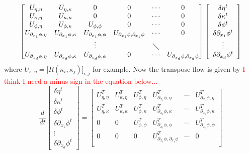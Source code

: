 \documentclass[noinfoline]{imsart}
\begin{document}
{\begin{equation}
\begin{bmatrix}
U_{\eta,\eta} & U_{\eta,\kappa} & 0 &  0 & \cdots  &  0\\
U_{\kappa,\eta} & U_{\kappa,\kappa} & 0 &  0 & \cdots  &  0\\
U_{\phi,\eta} & U_{\phi,\kappa} & U_{\phi,\phi} & 0 & \cdots  &  0\\
U_{\partial_{x_1} \phi,\eta} & U_{\partial_{x_1} \phi,\kappa} & U_{\partial_{x_1} \phi,\phi} & U_{\partial_{x_1} \phi,\partial_{x_1} \phi} & \cdots  & 0 \\
&&\vdots & &\diagdown& \\
U_{\partial_{x_d} \phi,\eta} & U_{\partial_{x_d} \phi,\kappa} & U_{\partial_{x_d} \phi,\phi} & 0 & \cdots  & U_{\partial_{x_d} \phi,\partial_{x_d} \phi}
\end{bmatrix}
  \left[\begin{array}{c} \delta\eta^t\\ \delta \kappa^t \\ \delta\phi^t \\ \delta\partial_{x_1} \phi^t \\ \vdots \\ \delta\partial_{x_d} \phi^t \end{array}\right]
\end{equation}
where $U_{\kappa,\eta}= \bigl[ R(\kappa_i,\kappa_j) \bigr]_{i,j}$ for example. Now the transpose flow is given by \textcolor{red}{I think I need a minus sign in the equation below...}
\begin{equation}
\frac{d}{dt} \left[\begin{array}{c} \delta\eta^t\\ \delta \kappa^t \\ \delta\phi^t \\ \delta\partial_{x_1} \phi^t  \\ \vdots \\ \delta\partial_{x_d} \phi^t   \end{array}\right]
=
\begin{bmatrix}
U_{\eta,\eta}^T   & U_{\kappa,\eta}^T & U_{\phi,\eta}^T &  U_{\partial_{x_1} \phi,\eta}^T & \cdots  &  U_{\partial_{x_d} \phi,\eta}^T \\
U_{\eta,\kappa}^T & U_{\kappa,\kappa}^T & U_{\phi,\kappa}^T &  U_{\partial_{x_1} \phi,\kappa}^T & \cdots  &  U_{\partial_{x_d} \phi,\kappa}^T\\
0 & 0 & U_{\phi,\phi}^T & U_{\partial_{x_1} \phi,\phi}^T & \cdots  &  U_{\partial_{x_d} \phi,\phi}^T\\
0 & 0 & 0 & U_{\partial_{x_1} \phi,\partial_{x_1} \phi}^T & \cdots  & 0 \\

\end{bmatrix}
\end{equation}}
\end{document}
